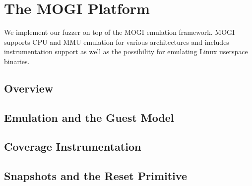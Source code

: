 
\chapter{The MOGI Platform}\label{chap:platform}

We implement our fuzzer on top of the MOGI emulation framework.
MOGI supports CPU and MMU emulation for various architectures and includes
instrumentation support as well as the possibility for emulating Linux userspace
binaries.

\section{Overview}\label{sec:platform-overview}


\section{Emulation and the Guest Model}\label{sec:platform-emulation}


\section{Coverage Instrumentation}\label{sec:platform-coverage}


\section{Snapshots and the Reset Primitive}\label{sec:platform-snapshots}

